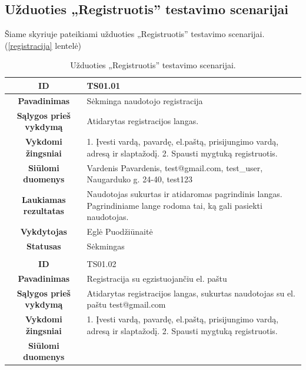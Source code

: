 \documentclass{VUMIFPSkursinis}
\begin{document}
	\subsection{Užduoties „Registruotis” testavimo scenarijai}
	Šiame skyriuje pateikiami užduoties „Registruotis” testavimo scenarijai. (\ref{registracija} lentelė)
	\begin{table}[H]
		\caption{Užduoties „Registruotis” testavimo scenarijai.}
		\begin{tabular}{|p{6cm}|p{11cm}|}
			\hline
			\multicolumn{1}{|c|}{{\bfseries ID}}&
			{TS01.01}\\
			\hline
			\multicolumn{1}{|c|}{{\bfseries Pavadinimas}}&
			{Sėkminga naudotojo registracija}\\
			\hline
			\multicolumn{1}{|c|}{{\bfseries Sąlygos prieš vykdymą}}&
			{Atidarytas registracijos langas.}\\
			\hline
			\multicolumn{1}{|c|}{{\bfseries Vykdomi žingsniai}}&
			{1. Įvesti vardą, pavardę, el.paštą, prisijungimo vardą, adresą ir slaptažodį.
			 2. Spausti mygtuką registruotis.}\\
			\hline
			\multicolumn{1}{|c|}{{\bfseries Siūlomi duomenys}}&
			{Vardenis Pavardenis, test@gmail.com, test\_user, Naugarduko g. 24-40, test123}\\
			\hline
			\multicolumn{1}{|c|}{{\bfseries Laukiamas rezultatas}}&
			{Naudotojas sukurtas ir atidaromas pagrindinis langas. Pagrindiniame lange rodoma tai, ką gali pasiekti naudotojas.}\\
			\hline
			\multicolumn{1}{|c|}{{\bfseries Vykdytojas}}&
			{Eglė Puodžiūnaitė}\\
			\hline
			\multicolumn{1}{|c|}{{\bfseries Statusas}}&
			{Sėkmingas}\\
			\hline
			\rowcolor{lightgray}
			\multicolumn{2}{|c|}{}\\
			\hline
			\multicolumn{1}{|c|}{{\bfseries ID}}&
			{TS01.02}\\
			\hline
			\multicolumn{1}{|c|}{{\bfseries Pavadinimas}}&
			{Registracija su egzistuojančiu el. paštu}\\
			\hline
			\multicolumn{1}{|c|}{{\bfseries Sąlygos prieš vykdymą}}&
			{Atidarytas registracijos langas, sukurtas naudotojas su el. paštu test@gmail.com}\\
			\hline
			\multicolumn{1}{|c|}{{\bfseries Vykdomi žingsniai}}&
			{1. Įvesti vardą, pavardę, el.paštą, prisijungimo vardą, adresą ir slaptažodį.
			 2. Spausti mygtuką registruotis.}\\
			\hline
			\multicolumn{1}{|c|}{{\bfseries Siūlomi duomenys}}&

\end{tabular}
\end{table}
\end{document}
